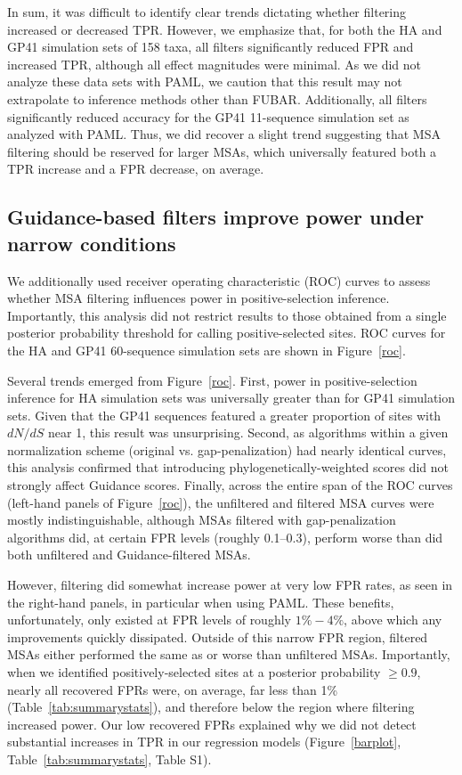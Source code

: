 \documentclass[11pt]{article}
\begin{document}
In sum, it was difficult to identify clear trends dictating whether filtering increased or decreased TPR. However, we emphasize that, for both the HA and GP41 simulation sets of 158 taxa, all filters significantly reduced FPR and increased TPR, although all effect magnitudes were minimal. As we did not analyze these data sets with PAML, we caution that this result may not extrapolate to inference methods other than FUBAR. Additionally, all filters significantly reduced accuracy for the GP41 11-sequence simulation set as analyzed with PAML. Thus, we did recover a slight trend suggesting that MSA filtering should be reserved for larger MSAs, which universally featured both a TPR increase and a FPR decrease, on average.

\subsection*{Guidance-based filters improve power under narrow conditions}

We additionally used receiver operating characteristic (ROC) curves to assess whether MSA filtering influences power in positive-selection inference. Importantly, this analysis did not restrict results to those obtained from a single posterior probability threshold for calling positive-selected sites. ROC curves for the HA and GP41 60-sequence simulation sets are shown in Figure~\ref{roc}. 

Several trends emerged from Figure~\ref{roc}. First, power in positive-selection inference for HA simulation sets was universally greater than for GP41 simulation sets. Given that the GP41 sequences featured a greater proportion of sites with $dN/dS$ near 1, this result was unsurprising. Second, as algorithms within a given normalization scheme (original vs. gap-penalization) had nearly identical curves, this analysis confirmed that introducing phylogenetically-weighted scores did not strongly affect Guidance scores. Finally, across the entire span of the ROC curves (left-hand panels of Figure~\ref{roc}), the unfiltered and filtered MSA curves were mostly indistinguishable, although MSAs filtered with gap-penalization algorithms did, at certain FPR levels (roughly 0.1--0.3), perform worse than did both unfiltered and Guidance-filtered MSAs. 

However, filtering did somewhat increase power at very low FPR rates, as seen in the right-hand panels, in particular when using PAML. These benefits, unfortunately, only existed at FPR levels of roughly $1\% - 4\%$, above which any improvements quickly dissipated. Outside of this narrow FPR region, filtered MSAs either performed the same as or worse than unfiltered MSAs. Importantly, when we identified positively-selected sites at a posterior probability $\geq 0.9$, nearly all recovered FPRs were, on average, far less than 1\% (Table~\ref{tab:summarystats}), and therefore below the region where filtering increased power. Our low recovered FPRs explained why we did not detect substantial increases in TPR in our regression models (Figure~\ref{barplot}, Table~\ref{tab:summarystats}, Table S1).
\end{document}
